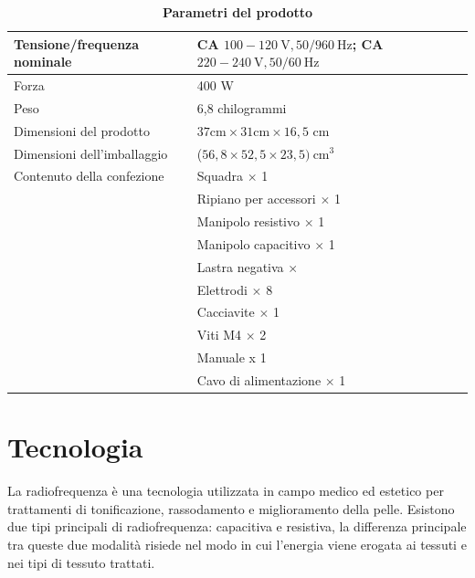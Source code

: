 \documentclass[a4paper]{article}
\begin{document}
\begin{table}[H]
\centering
\captionsetup{labelformat=empty}
\caption{\textbf{Parametri del prodotto}}
\begin{tabular}{|l|l|}
\hline
Tensione/frequenza nominale & CA $100-120 \mathrm{~V}, 50 / 960 \mathrm{~Hz}$; CA $220-240 \mathrm{~V}, 50 / 60 \mathrm{~Hz}$ \\
\hline
Forza & 400 W \\
\hline
Peso & 6,8 chilogrammi \\
\hline
Dimensioni del prodotto & $37 \mathrm{cm} \times 31 \mathrm{cm} \times 16,5$ cm \\
\hline
Dimensioni dell'imballaggio & ($56,8 \times 52,5 \times 23,5) \mathrm{~cm}^3$ \\
\hline
Contenuto della confezione & Squadra $\times$ 1 \\
\hline
 & Ripiano per accessori $\times$ 1 \\
\hline
 & Manipolo resistivo $\times$ 1 \\
\hline
 & Manipolo capacitivo $\times$ 1 \\
\hline
 & Lastra negativa $\times$ \\
\hline
 & Elettrodi $\times$ 8 \\
\hline
 & Cacciavite $\times$ 1 \\
\hline
 & Viti M4 $\times$ 2 \\
\hline
 & Manuale x 1 \\
\hline
 & Cavo di alimentazione $\times$ 1 \\
\hline
\end{tabular}
\end{table}

\section{Tecnologia}
La radiofrequenza è una tecnologia utilizzata in campo medico ed estetico per trattamenti di tonificazione, rassodamento e miglioramento della pelle. Esistono due tipi principali di radiofrequenza: capacitiva e resistiva, la differenza principale tra queste due modalità risiede nel modo in cui l'energia viene erogata ai tessuti e nei tipi di tessuto trattati.
\end{document}

